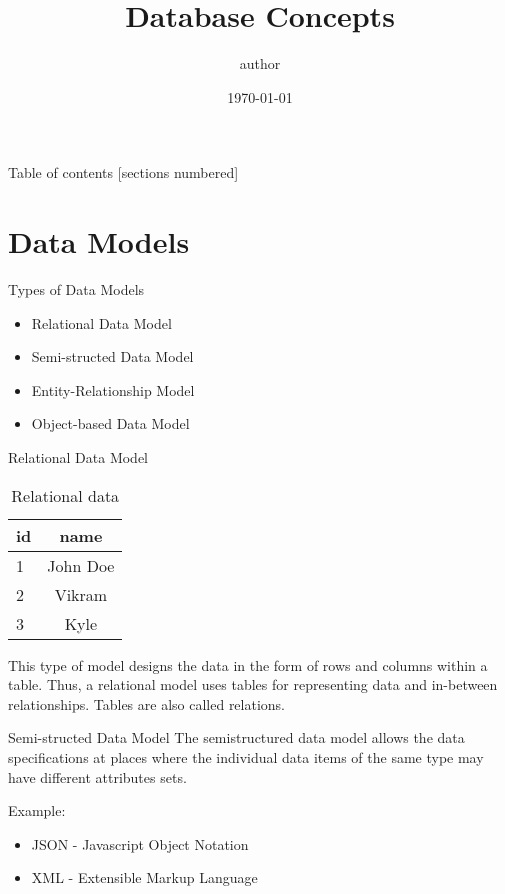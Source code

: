 \documentclass[12pt, aspectratio=169]{beamer}
\title{Database Concepts}
\date{\today}
\author{author}
\institute{company}
\begin{document}
\maketitle

\begin{frame}{Table of contents}
    [sections numbered]
    \tableofcontents
\end{frame}

\section{Data Models}
\begin{frame}{Types of Data Models}
\begin{itemize}
    \item Relational Data Model
    \item Semi-structed Data Model
    \item Entity-Relationship Model
    \item Object-based Data Model
\end{itemize}
\end{frame}
\begin{frame} {Relational Data Model}
    \begin{table}[]
        \centering
        \begin{tabular}{|l|c|}
        \hline
            id & name \\
            \hline
            1 & John Doe \\
            2 & Vikram \\
            3 & Kyle \\
            \hline
        \end{tabular}
        \caption{Relational data}
        \label{tab:my_label}
    \end{table}
    This type of model designs the data in the form of rows and columns within a table. Thus, a relational model uses tables for representing data and in-between relationships. Tables are also called relations. 
\end{frame}
\begin{frame}{Semi-structed Data Model}
        The semistructured data model allows the data specifications at places where the individual data items of the same type may have different attributes sets.

        Example:
        \begin{itemize}
            \item \alert{JSON} - Javascript Object Notation
        \item \alert{XML} - Extensible Markup Language
        \end{itemize}
\end{frame}
\end{document}
